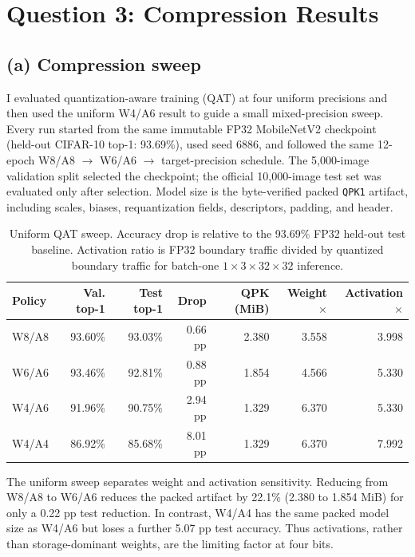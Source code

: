 \section{Question 3: Compression Results}

\subsection{(a) Compression sweep}

I evaluated quantization-aware training (QAT) at four uniform precisions and
then used the uniform W4/A6 result to guide a small mixed-precision sweep.
Every run started from the same immutable FP32 MobileNetV2 checkpoint (held-out
CIFAR-10 top-1: 93.69\%), used seed 6886, and followed the same 12-epoch
W8/A8 $\rightarrow$ W6/A6 $\rightarrow$ target-precision schedule. The
5,000-image validation split selected the checkpoint; the official 10,000-image
test set was evaluated only after selection. Model size is the byte-verified
packed \texttt{QPK1} artifact, including scales, biases, requantization fields,
descriptors, padding, and header.

\begin{table}[H]
    \centering
    \small
    \caption{Uniform QAT sweep. Accuracy drop is relative to the 93.69\% FP32 held-out test baseline. Activation ratio is FP32 boundary traffic divided by quantized boundary traffic for batch-one $1\times3\times32\times32$ inference.}
    \label{tab:q3-uniform-sweep}
    \begin{tabular}{lrrrrrr}
        \toprule
        Policy & Val. top-1 & Test top-1 & Drop & QPK (MiB) & Weight $\times$ & Activation $\times$ \\
        \midrule
        W8/A8 & 93.60\% & 93.03\% & 0.66 pp & 2.380 & 3.558 & 3.998 \\
        W6/A6 & 93.46\% & 92.81\% & 0.88 pp & 1.854 & 4.566 & 5.330 \\
        W4/A6 & 91.96\% & 90.75\% & 2.94 pp & 1.329 & 6.370 & 5.330 \\
        W4/A4 & 86.92\% & 85.68\% & 8.01 pp & 1.329 & 6.370 & 7.992 \\
        \bottomrule
    \end{tabular}
\end{table}

The uniform sweep separates weight and activation sensitivity. Reducing from
W8/A8 to W6/A6 reduces the packed artifact by 22.1\% (2.380 to 1.854 MiB) for
only a 0.22 pp test reduction. In contrast, W4/A4 has the same packed model
size as W4/A6 but loses a further 5.07 pp test accuracy. Thus activations,
rather than storage-dominant weights, are the limiting factor at four bits.

